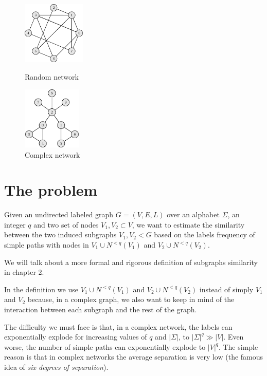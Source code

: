 \begin{figure}[h]
	\centering
	\begin{minipage}[t]{.45\textwidth}
		\centering
		\includegraphics[width=3cm,height=3cm]{figure/figure-1-3}
		\caption{Random network}
	\end{minipage}\hfill
	\begin{minipage}[t]{.45\textwidth}
		\centering
		\includegraphics[width=2.8cm,height=3cm]{figure/figure-1-4}
		\caption{Complex network}
	\end{minipage}
\end{figure}

\section{The problem}

\begin{problema}
	Given an undirected labeled graph $G=(V,E,L)$ over an alphabet $\Sigma$, an integer $q$
	and two set of nodes $V_{1}, V_{2} \subset V$, we want to estimate the similarity between the two induced subgraphs $V_{1}, V_{2} < G$ based on the labels frequency of simple paths with nodes in $V_{1} \cup N^{<q}(V_{1})$ and $V_{2} \cup N^{<q}(V_{2})$.
\end{problema}

We will talk about a more formal and rigorous definition of subgraphs similarity in chapter 2.\medskip

In the definition we use $V_{1} \cup N^{<q}(V_{1})$ and $V_{2} \cup N^{<q}(V_{2})$ instead of simply $V_{1}$ and $V_{2}$ because, in a complex graph, we also want to keep in mind of the interaction between each subgraph and the rest of the graph.\medskip

The difficulty we must face is that, in a complex network, the labels can exponentially explode for increasing values of $q$ and $|\Sigma|$, to $|\Sigma|^{q} \gg |V|$. Even worse, the number of simple paths can exponentially explode to $|V|^{q}$.  The simple reason is that in complex networks the average separation is very low (the famous idea of \textit{six degrees of separation}).\medskip

